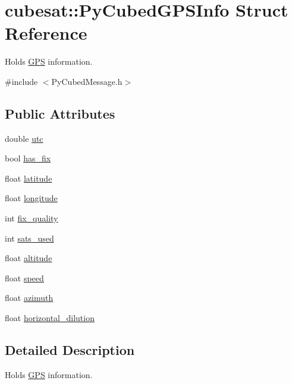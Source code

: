 \hypertarget{structcubesat_1_1PyCubedGPSInfo}{}\section{cubesat\+:\+:Py\+Cubed\+G\+P\+S\+Info Struct Reference}
\label{structcubesat_1_1PyCubedGPSInfo}


Holds \hyperlink{classcubesat_1_1GPS}{G\+PS} information.  




{\ttfamily \#include $<$Py\+Cubed\+Message.\+h$>$}

\subsection*{Public Attributes}
\begin{DoxyCompactItemize}
\item 
double \hyperlink{structcubesat_1_1PyCubedGPSInfo_a9b8ffa6900d012699f34d153f7627df0}{utc}
\item 
bool \hyperlink{structcubesat_1_1PyCubedGPSInfo_aceff52264e7dc35b16815a76f64ddf38}{has\+\_\+fix}
\item 
float \hyperlink{structcubesat_1_1PyCubedGPSInfo_ac882635c134690ebe3e3954994813aad}{latitude}
\item 
float \hyperlink{structcubesat_1_1PyCubedGPSInfo_a98f2a6836eb2241c73706275f741ff21}{longitude}
\item 
int \hyperlink{structcubesat_1_1PyCubedGPSInfo_a5d196d291995d333d96619ae42ec8db2}{fix\+\_\+quality}
\item 
int \hyperlink{structcubesat_1_1PyCubedGPSInfo_a44143eae28701400a9207070a1d11313}{sats\+\_\+used}
\item 
float \hyperlink{structcubesat_1_1PyCubedGPSInfo_ab346faa97efc88a47baa7e02c97c1a5c}{altitude}
\item 
float \hyperlink{structcubesat_1_1PyCubedGPSInfo_add984c0de8a29d599599ef53e04c36e4}{speed}
\item 
float \hyperlink{structcubesat_1_1PyCubedGPSInfo_ae3df76da7bda80654e92816ae2ce2102}{azimuth}
\item 
float \hyperlink{structcubesat_1_1PyCubedGPSInfo_a6ad260b32002bc66811b84e9eb4ec153}{horizontal\+\_\+dilution}
\end{DoxyCompactItemize}


\subsection{Detailed Description}
Holds \hyperlink{classcubesat_1_1GPS}{G\+PS} information. 

